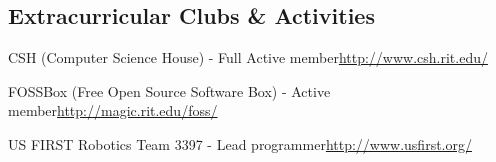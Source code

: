 \documentclass[a4paper,margin,line]{resume}
\newcommand{\rurl}[1]{\hfill {\footnotesize \url{#1}}}
\begin{document}
\begin{resume}
\section{\mysidestyle Extracurricular Clubs \& Activities}
	\begin{asparablank}
    \item CSH ({\small Computer Science House}) - {\small Full Active member}\rurl{http://www.csh.rit.edu/}
    \item FOSSBox ({\small Free Open Source Software Box}) - {\small Active member}\rurl{http://magic.rit.edu/foss/}
    \item US FIRST Robotics Team 3397 - {\small Lead programmer}\rurl{http://www.usfirst.org/}
	\end{asparablank}

\end{resume}
\end{document}
